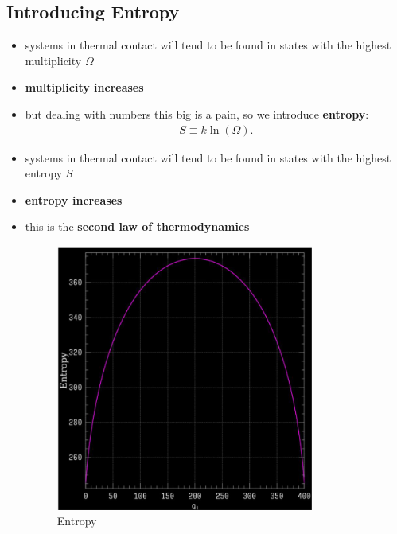 \documentclass[10pt]{article}
\begin{document}
\subsection{Introducing Entropy}
\begin{itemize}
    \item systems in thermal contact will tend to be found in states with the highest multiplicity $\Omega$
    \item \textbf{multiplicity increases}
    \item but dealing with numbers this big is a pain, so we introduce \textbf{entropy}:
         \begin{align*}
            S \equiv k \ln(\Omega)
        .\end{align*}
    \item systems in thermal contact will tend to be found in states with the highest entropy $S$
    \item \textbf{entropy increases}
    \item this is the \textbf{second law of thermodynamics}
        \begin{figure}[h]
            \centering
            \includegraphics[width=0.8\textwidth]{entropyGraph}
            \caption{Entropy}
            \label{fig:entropyGraph}
        \end{figure}
\end{itemize}
\end{document}
